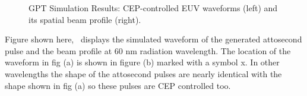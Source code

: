 \begin{figure}
  \caption{GPT Simulation Results: CEP-controlled EUV waveforms (left) and its spatial beam
  profile (right).}
\end{figure}

Figure shown here, \ displays the simulated waveform of the generated attosecond
pulse and the beam profile at 60 nm radiation wavelength. The location of the
waveform in fig (a) is shown in figure (b) marked with a symbol x. In other
wavelengths the shape of the attosecond pulses are nearly identical with the
shape shown in fig (a) so these pulses are CEP controlled too.








